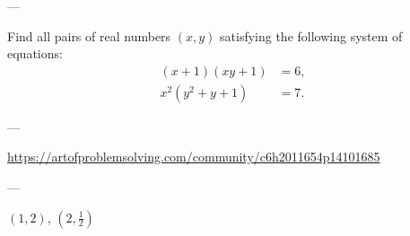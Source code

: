 
---

Find all pairs of real numbers $(x,y)$ satisfying the following system of equations:
\begin{align*}
    (x+1)(xy+1)&=6,\\
    x^2(y^2+y+1)&=7.
\end{align*}

---

\url{https://artofproblemsolving.com/community/c6h2011654p14101685}

---

$(1,2)$, $(2,\tfrac12)$
